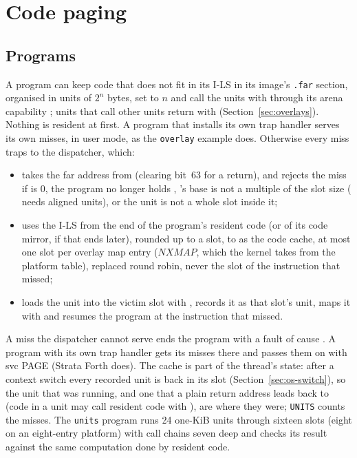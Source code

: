 \section{Code paging}

\subsection{Programs}\label{sec:os-paging}

A program can keep code that does not fit in its I-LS in its image's \texttt{.far} section, organised
in units of $2^n$ bytes, set  to $n$ and call the units with  through its arena
capability ; units that call other units return with 
(Section~\ref{sec:overlays}). Nothing is resident at first. A program that installs its own trap handler
serves its own misses, in user mode, as the \texttt{overlay} example does. Otherwise every miss traps
to the dispatcher, which:
\begin{itemize}
\item takes the far address from  (clearing bit~63 for a return), and rejects the miss if
   is 0, the program no longer holds , 's base is not a multiple of the
  slot size ( needs aligned units), or the unit is not a whole slot inside it;
\item uses the I-LS from the end of the program's resident code (or of its code mirror, if that ends
  later), rounded up to a slot, to  as the code cache, at most one slot per overlay map
  entry ($\textit{NXMAP}$, which the kernel takes from the platform table), replaced round robin, never
  the slot of the instruction that missed;
\item loads the unit into the victim slot with , records it as that slot's unit, maps it
  with  and resumes the program at the instruction that missed.
\end{itemize}
A miss the dispatcher cannot serve ends the program with a fault of cause . A program
with its own trap handler gets its misses there and passes them on with svc PAGE (Strata Forth does).
The cache is part of the thread's state: after a context switch every recorded unit is back in its
slot (Section~\ref{sec:os-switch}), so the unit that was running, and one that a plain return address
leads back to (code in a unit may call resident code with ), are where they were;
\texttt{UNITS} counts the misses. The \texttt{units} program runs 24 one-KiB units through sixteen
slots (eight on an eight-entry platform) with call chains seven deep and checks its result against the
same computation done by resident code.

